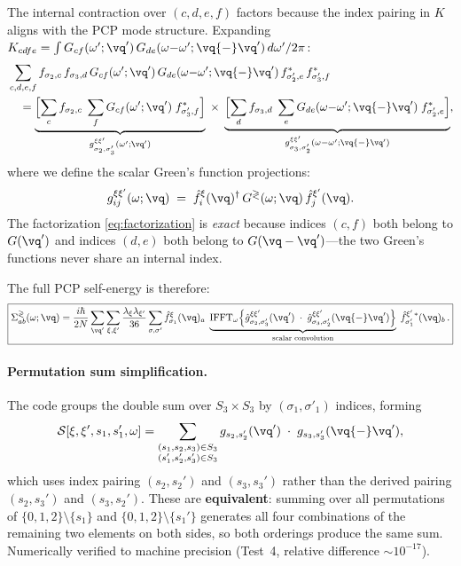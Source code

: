 The internal contraction over $(c,d,e,f)$ factors because the
index pairing in $K$ aligns with the PCP mode structure.
Expanding $K_{cdfe} = \int G_{cf}(\omega';\vq')\,G_{de}(\omega{-}\omega';\vq{-}\vq')\,d\omega'/2\pi$:
\begin{align}
  &\sum_{c,d,e,f}
    f_{\sigma_2,c}\,f_{\sigma_3,d}\,
    G_{cf}(\omega';\vq')\,G_{de}(\omega{-}\omega';\vq{-}\vq')\,
    f^*_{\sigma'_2,e}\,f^*_{\sigma'_3,f}
  \notag\\
  &\quad=
    \underbrace{
      \Bigl[\sum_c f_{\sigma_2,c}\;\sum_f G_{cf}(\omega';\vq')\;
      f^*_{\sigma'_3,f}\Bigr]
    }_{g_{\sigma_2,\sigma'_3}^{\xi\xi'}(\omega';\vq')}
    \;\times\;
    \underbrace{
      \Bigl[\sum_d f_{\sigma_3,d}\;\sum_e G_{de}(\omega{-}\omega';\vq{-}\vq')\;
      f^*_{\sigma'_2,e}\Bigr]
    }_{g_{\sigma_3,\sigma'_2}^{\xi\xi'}(\omega{-}\omega';\vq{-}\vq')},
  \label{eq:factorization}
\end{align}
where we define the scalar Green's function projections:
\begin{equation}\label{eq:scalar_gf}
  g_{ij}^{\xi\xi'}(\omega;\vq)
  \;=\; \hat{f}_i^{\xi}(\vq)^\dagger\,
    G^{\gtrless}(\omega;\vq)\,
    \hat{f}_j^{\xi'}(\vq).
\end{equation}
The factorization \cref{eq:factorization} is \emph{exact} because
indices $(c, f)$ both belong to $G(\vq')$ and indices $(d, e)$
both belong to $G(\vq - \vq')$---the two Green's functions
never share an internal index.

The full PCP self-energy is therefore:
\begin{equation}\label{eq:pcp_sigma_scalar}
  \boxed{
  \Sigma^{\gtrless}_{ab}(\omega;\vq)
  = \frac{i\hbar}{2N}\sum_{\vq'}
    \sum_{\xi,\xi'} \frac{\lambda_\xi \lambda_{\xi'}}{36}
    \sum_{\sigma,\sigma'}
    \hat{f}_{\sigma_1}^\xi(\vq)_a\;
    \underbrace{
      \mathrm{IFFT}_\omega\Bigl\{
        \hat{g}_{\sigma_2,\sigma'_3}^{\xi\xi'}(\vq')\;\cdot\;
        \hat{g}_{\sigma_3,\sigma'_2}^{\xi\xi'}(\vq{-}\vq')
      \Bigr\}
    }_{\text{scalar convolution}}
    \;\hat{f}_{\sigma'_1}^{\xi'\,*}(\vq)_b\,.
  }
\end{equation}

\paragraph{Permutation sum simplification.}
The code groups the double sum over $S_3 \times S_3$ by
$(\sigma_1, \sigma'_1)$ indices, forming
\begin{equation}
  \mathcal{S}[\xi,\xi',s_1,s_1',\omega]
  = \sum_{\substack{(s_1,s_2,s_3)\in S_3 \\ (s_1',s_2',s_3')\in S_3}}
    g_{s_2,s_2'}(\vq')\;\cdot\; g_{s_3,s_3'}(\vq{-}\vq'),
\end{equation}
which uses index pairing $(s_2, s_2')$ and $(s_3, s_3')$ rather
than the derived pairing $(s_2, s_3')$ and $(s_3, s_2')$.  These
are \textbf{equivalent}: summing over all permutations of
$\{0,1,2\}\setminus\{s_1\}$ and
$\{0,1,2\}\setminus\{s_1'\}$ generates all four combinations of
the remaining two elements on both sides, so both orderings
produce the same sum.  Numerically verified to machine precision
(Test~4, relative difference $\sim 10^{-17}$).


